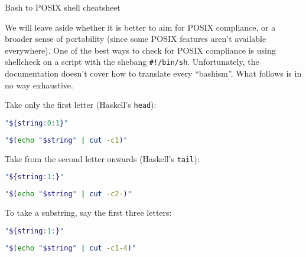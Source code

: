 \documentclass{article}
\begin{document}
\begin{center}
\Large Bash to POSIX shell cheatsheet
\end{center}

We will leave aside whether it is better to aim for POSIX compliance, or a
broader sense of portability (since some POSIX features aren't available
everywhere). One of the best ways to check for POSIX compliance is using
shellcheck on a script with the shebang {\tt \#!/bin/sh}. Unfortunately, the
documentation doesn't cover how to translate every ``bashism''. What follows is
in no way exhaustive.

Take only the first letter (Haskell's {\tt head}):

\begin{minipage}{.5\textwidth}
\begin{lstlisting}[language=sh]
"${string:0:1}"
\end{lstlisting}
\end{minipage}%
\begin{minipage}{.5\textwidth}
\begin{lstlisting}[language=bash]
  "$(echo "$string" | cut -c1)"
\end{lstlisting}
\end{minipage}

Take from the second letter onwards (Haskell's {\tt tail}):

\begin{minipage}{.5\textwidth}
\begin{lstlisting}[language=sh]
"${string:1:}"
\end{lstlisting}
\end{minipage}%
\begin{minipage}{.5\textwidth}
\begin{lstlisting}[language=bash]
  "$(echo "$string" | cut -c2-)"
\end{lstlisting}
\end{minipage}

To take a substring, say the first three letters:

\begin{minipage}{.5\textwidth}
\begin{lstlisting}[language=sh]
"${string:1:}"
\end{lstlisting}
\end{minipage}%
\begin{minipage}{.5\textwidth}
\begin{lstlisting}[language=bash]
"$(echo "$string" | cut -c1-4)"
\end{lstlisting}
\end{minipage}
\end{document}

